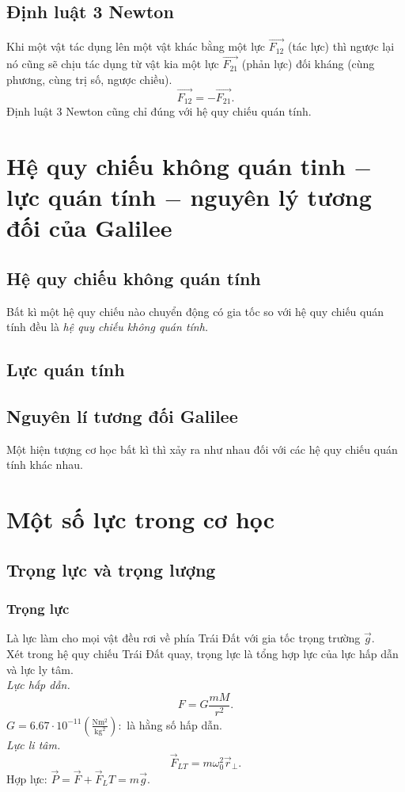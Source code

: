 \subsection{Định luật 3 Newton}
Khi một vật tác dụng lên một vật khác bằng một lực $\overrightarrow{F_{12}}$ (tác lực) thì ngược lại nó cũng sẽ chịu tác dụng từ vật kia một lực $\overrightarrow{F_{21}}$ (phản lực) đối kháng (cùng phương, cùng trị số, ngược chiều).
$$\overrightarrow{F_{12}} = - \overrightarrow{F_{21}}.$$
Định luật 3 Newton cũng chỉ đúng với hệ quy chiếu quán tính.
\section{Hệ quy chiếu không quán tinh $-$ lực quán tính $-$ nguyên lý tương đối của Galilee}
\subsection{Hệ quy chiếu không quán tính}
Bất kì một hệ quy chiếu nào chuyển động có gia tốc so với hệ quy chiếu quán tính đều là \textit{hệ quy chiếu không quán tính.}
\subsection{Lực quán tính}
\subsection{Nguyên lí tương đối Galilee}
Một hiện tượng cơ học bất kì thì xảy ra như nhau đối với các hệ quy chiếu quán tính khác nhau.
\section{Một số lực trong cơ học}
\subsection{Trọng lực và trọng lượng}
\subsubsection{Trọng lực}
Là lực làm cho mọi vật đều rơi về phía Trái Đất với gia tốc trọng trường $\overrightarrow{g}.$\\
Xét trong hệ quy chiếu Trái Đất quay, trọng lực là tổng hợp lực của lực hấp dẫn và lực ly tâm.\\
\textit{Lực hấp dẫn.}
$$F = G \frac{mM}{r^2}.$$
$G = 6.67 \cdot 10^{-11} \left( {\mathrm{\frac{Nm^2}{kg^2}}} \right):$ là hằng số hấp dẫn.\\
\textit{Lực li tâm.} 
$${\overrightarrow F _{LT}} = m\omega _0^2{\overrightarrow r _ \bot }.$$ 
Hợp lực: $\overrightarrow{P} = \overrightarrow{F} + \overrightarrow{F}_LT = m \overrightarrow{g}.$
